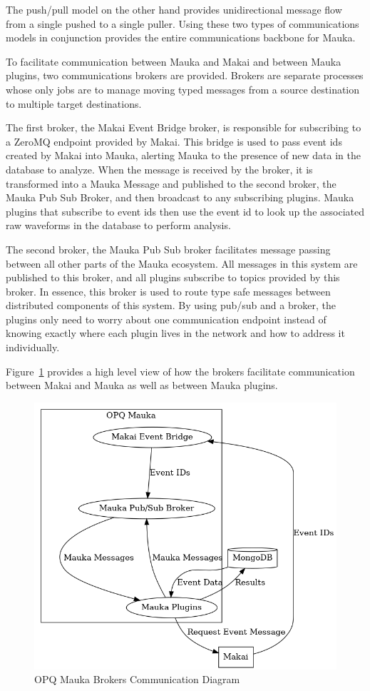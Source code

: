 The push/pull model on the other hand provides unidirectional message flow from a single pushed to a single puller. Using these two types of communications models in conjunction provides the entire communications backbone for Mauka.

To facilitate communication between Mauka and Makai and between Mauka plugins, two communications brokers are provided. Brokers are separate processes whose only jobs are to manage moving typed messages from a source destination to multiple target destinations.

The first broker, the Makai Event Bridge broker, is responsible for subscribing to a ZeroMQ endpoint provided by Makai. This bridge is used to pass event ids created by Makai into Mauka, alerting Mauka to the presence of new data in the database to analyze. When the message is received by the broker, it is transformed into a Mauka Message and published to the second broker, the Mauka Pub Sub Broker, and then broadcast to any subscribing plugins. Mauka plugins that subscribe to event ids then use the event id to look up the associated raw waveforms in the database to perform analysis.

The second broker, the Mauka Pub Sub broker facilitates message passing between all other parts of the Mauka ecosystem. All messages in this system are published to this broker, and all plugins subscribe to topics provided by this broker. In essence, this broker is used to route type safe messages between distributed components of this system. By using pub/sub and a broker, the plugins only need to worry about one communication endpoint instead of knowing exactly where each plugin lives in the network and how to address it individually.

Figure~\ref{fig:mauka_brokers} provides a high level view of how the brokers facilitate communication between Makai and Mauka as well as between Mauka plugins.

\begin{figure}
	\centering
	\includegraphics[width=\linewidth]{figures/mauka_brokers_communication.png}
	\caption{OPQ Mauka Brokers Communication Diagram}
	\label{fig:mauka_brokers}
\end{figure}

